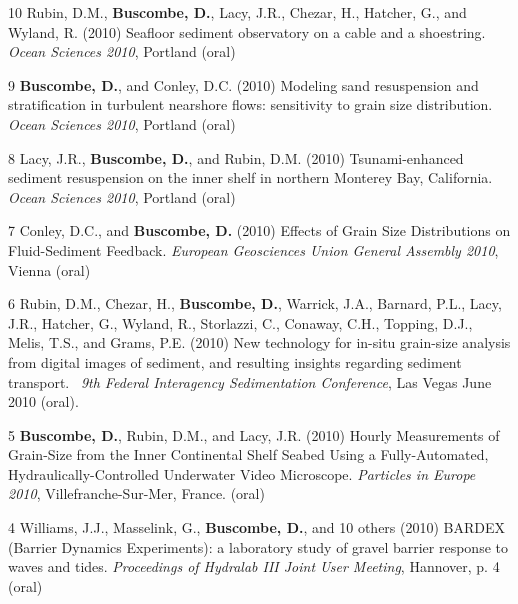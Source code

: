 \documentclass[margin,line]{resume}
\begin{document}
\begin{resume}
\begin{footnotesize}
\begin{list1}
	\item[10] Rubin, D.M., {\bf Buscombe, D.}, Lacy, J.R., Chezar, H., Hatcher, G., and Wyland, R. (2010) Seafloor sediment observatory on a cable and a shoestring. {\sl Ocean Sciences 2010}, Portland (oral)\\

	\item[9] {\bf Buscombe, D.}, and Conley, D.C. (2010) Modeling sand resuspension and stratification in turbulent nearshore flows: sensitivity to grain size distribution. {\sl Ocean Sciences 2010}, Portland (oral)\\

	\item[8] Lacy, J.R., {\bf Buscombe, D.}, and Rubin, D.M. (2010) Tsunami-enhanced sediment resuspension on the inner shelf in northern Monterey Bay, California. {\sl Ocean Sciences 2010}, Portland (oral)\\

	\item[7] Conley, D.C., and {\bf Buscombe, D.} (2010) Effects of Grain Size Distributions on Fluid-Sediment Feedback. {\sl European Geosciences Union General Assembly 2010}, Vienna (oral)\\

	\item[6] Rubin, D.M., Chezar, H., {\bf Buscombe, D.}, Warrick, J.A., Barnard, P.L., Lacy, J.R., Hatcher, G., Wyland, R., Storlazzi, C., Conaway, C.H., Topping, D.J., Melis, T.S., and Grams, P.E. (2010) New technology for in-situ grain-size analysis from digital images of sediment, and resulting insights regarding sediment transport.  {\sl 9th Federal Interagency Sedimentation Conference}, Las Vegas June 2010 (oral).\\

	\item[5] {\bf Buscombe, D.}, Rubin, D.M., and Lacy, J.R. (2010) Hourly Measurements of Grain-Size from the Inner Continental Shelf Seabed Using a Fully-Automated, Hydraulically-Controlled Underwater Video Microscope. {\sl Particles in Europe 2010}, Villefranche-Sur-Mer, France. (oral)\\

	\item[4] Williams, J.J., Masselink, G., {\bf Buscombe, D.}, and 10 others (2010) BARDEX (Barrier Dynamics Experiments): a laboratory study of gravel barrier response to waves and tides. {\sl Proceedings of Hydralab III Joint User Meeting}, Hannover, p. 4 (oral)
	\end{list1}
	

\end{footnotesize}
\end{resume}
\end{document}
